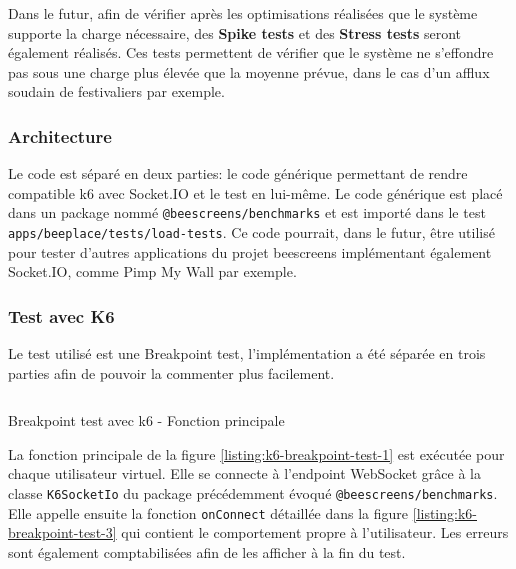Dans le futur, afin de vérifier après les optimisations réalisées que le système supporte la charge nécessaire, des \textbf{Spike tests} et des \textbf{Stress tests} seront également réalisés. Ces tests permettent de vérifier que le système ne s'effondre pas sous une charge plus élevée que la moyenne prévue, dans le cas d'un afflux soudain de festivaliers par exemple.

\subsubsection{Architecture}

Le code est séparé en deux parties: le code générique permettant de rendre compatible k6 avec Socket.IO et le test en lui-même. Le code générique est placé dans un package nommé \texttt{@beescreens/benchmarks} et est importé dans le test \texttt{apps/beeplace/tests/load-tests}. Ce code pourrait, dans le futur, être utilisé pour tester d'autres applications du projet \gls{beescreens} implémentant également Socket.IO, comme Pimp My Wall par exemple.


\subsubsection{Test avec K6}

Le test utilisé est une Breakpoint test, l'implémentation a été séparée en trois parties afin de pouvoir la commenter plus facilement.

\begin{listing}[H]
  \inputminted{ts}{assets/figures/breakpoint-test-1.ts}
  \caption{Breakpoint test avec k6 - Fonction principale}
  \label{listing:k6-breakpoint-test-1}
\end{listing}

La fonction principale de la figure \ref{listing:k6-breakpoint-test-1} est exécutée pour chaque utilisateur virtuel. Elle se connecte à l'endpoint WebSocket grâce à la classe \texttt{K6SocketIo} du package précédemment évoqué \texttt{@beescreens/benchmarks}. Elle appelle ensuite la fonction \texttt{onConnect} détaillée dans la figure \ref{listing:k6-breakpoint-test-3} qui contient le comportement propre à l'utilisateur. Les erreurs sont également comptabilisées afin de les afficher à la fin du test.

